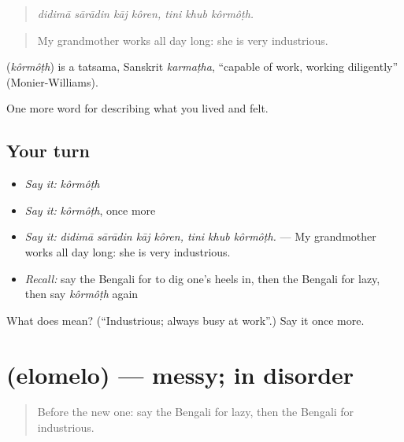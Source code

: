 \begin{quote}
\emph{didimā sārādin kāj kôren, tini khub kôrmôṭh.}
\end{quote}

\begin{quote}
My grandmother works all day long: she is very industrious.
\end{quote}

\begin{cousinweb}
\textbf{} (\emph{kôrmôṭh}) is a tatsama, Sanskrit \emph{karmaṭha}, \textquotedblleft{}capable of work, working diligently\textquotedblright{} (Monier-Williams).
\end{cousinweb}

\begin{grammarlens}[title={What you've built}]
One more word for describing what you lived and felt.
\end{grammarlens}

\subsection*{Your turn}
\begin{itemize}
\raggedright
  \item \emph{Say it:} \emph{kôrmôṭh}
  \item \emph{Say it:} \emph{kôrmôṭh}, once more
  \item \emph{Say it:} \emph{didimā sārādin kāj kôren, tini khub kôrmôṭh.} — My grandmother works all day long: she is very industrious.
  \item \emph{Recall:} say the Bengali for to dig one's heels in, then the Bengali for lazy, then say \emph{kôrmôṭh} again
\end{itemize}

\begin{tcolorbox}[breakable,colback=teal!4,colframe=teal!35!black,title={Before you move on}]
What does  mean? (\textquotedblleft{}Industrious; always busy at work\textquotedblright{}.) Say it once more.
\end{tcolorbox}
\section[\texorpdfstring{\bn{এলোমেলো} (elomelo)}{এলোমেলো (elomelo)}]{ (elomelo) — messy; in disorder}

\label{lesson:BN-C462-elomelo}



\begin{quote}
Before the new one: say the Bengali for lazy, then the Bengali for industrious.
\end{quote}

